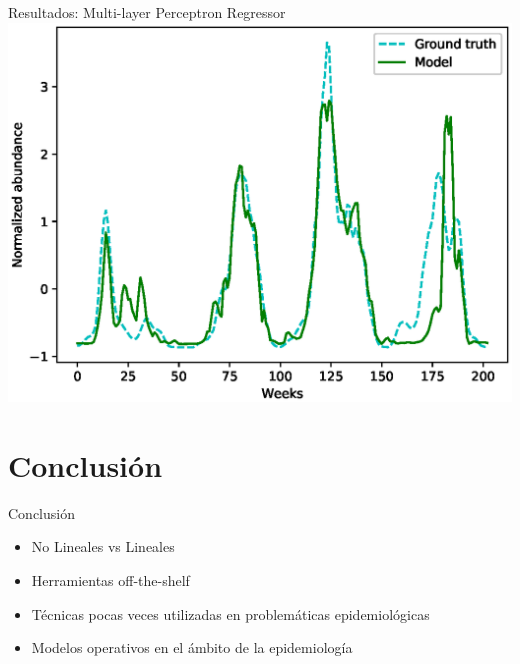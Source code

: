 \documentclass[10pt]{beamer}
\begin{document}
\begin{frame}{Resultados: Multi-layer Perceptron Regressor}
  \includegraphics[width=\textwidth]{mlpr.eps}
\end{frame}

\section{Conclusión}

\begin{frame}{Conclusión}
  \begin{itemize}[<+->]
    \item No Lineales vs Lineales

    \item Herramientas off-the-shelf

    \item Técnicas pocas veces utilizadas en problemáticas epidemiológicas

    \item Modelos operativos en el ámbito de la epidemiología
  \end{itemize}
\end{frame}
\end{document}
